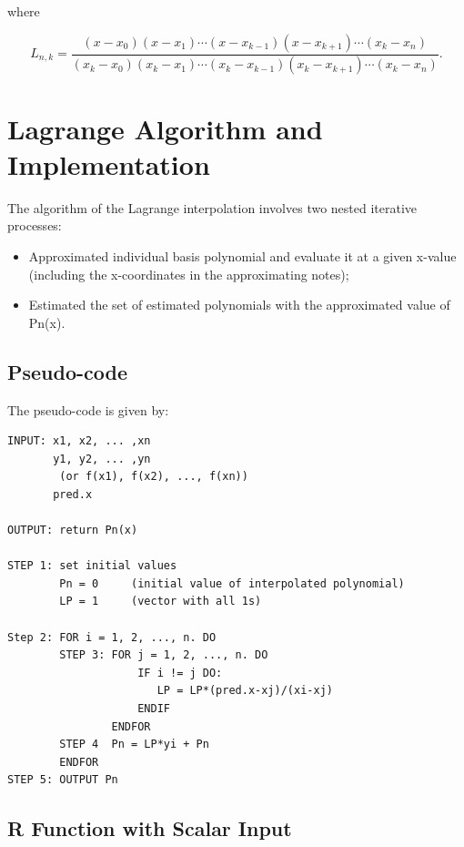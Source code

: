 \documentclass[
]{book}
\begin{document}
where

\[
L_{n,k} = \frac{(x-x_0)(x-x_1)\cdots(x-x_{k-1})(x-x_{k+1})\cdots(x_k-x_n)}{(x_k-x_0)(x_k-x_1)\cdots(x_k-x_{k-1})(x_k-x_{k+1})\cdots(x_k-x_n)}.
\]

\hypertarget{lagrange-algorithm-and-implementation}{%
\section{Lagrange Algorithm and Implementation}\label{lagrange-algorithm-and-implementation}}

The algorithm of the Lagrange interpolation involves two nested iterative processes:

\begin{itemize}
\item
  Approximated individual basis polynomial and evaluate it at a given x-value (including the x-coordinates in the approximating notes);
\item
  Estimated the set of estimated polynomials with the approximated value of Pn(x).
\end{itemize}

\hypertarget{pseudo-code}{%
\subsection{Pseudo-code}\label{pseudo-code}}

The pseudo-code is given by:

\begin{verbatim}
INPUT: x1, x2, ... ,xn
       y1, y2, ... ,yn
        (or f(x1), f(x2), ..., f(xn))
       pred.x  

OUTPUT: return Pn(x)

STEP 1: set initial values
        Pn = 0     (initial value of interpolated polynomial)
        LP = 1     (vector with all 1s)

Step 2: FOR i = 1, 2, ..., n. DO
        STEP 3: FOR j = 1, 2, ..., n. DO
                    IF i != j DO:
                       LP = LP*(pred.x-xj)/(xi-xj)
                    ENDIF
                ENDFOR
        STEP 4  Pn = LP*yi + Pn
        ENDFOR        
STEP 5: OUTPUT Pn              
\end{verbatim}

\hypertarget{r-function-with-scalar-input}{%
\subsection{R Function with Scalar Input}\label{r-function-with-scalar-input}}
\end{document}
